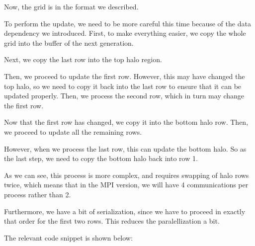 \documentclass{report}
\begin{document}
Now, the grid is in the format we described.

To perform the update, we need to be more careful this time because of the 
data dependency we introduced. First, to make everything easier, we copy the whole
grid into the buffer of the next generation. 

Next, we copy the last row into the top halo region. 

Then, we proceed to update the first row. However, this may have changed the top
halo, so we need to copy it back into the last row to ensure that it can be 
updated properly. Then, we process the second row, which in turn may 
change the first row. 

Now that the first row has changed, we copy it into the bottom halo row. Then, 
we proceed to update all the remaining rows. 

However, when we process the last row, this can update the bottom halo. 
So as the last step, we need to copy the bottom halo back into row 1. 

As we can see, this process is more complex, and requires swapping of halo rows 
twice, which means that in the MPI version, we will have 4 communications per process 
rather than 2. 

Furthermore, we have a bit of serialization, since we have to proceed in exactly 
that order for the first two rows. This reduces the paralellization a bit. 

The relevant code snippet is shown below:
\end{document}
